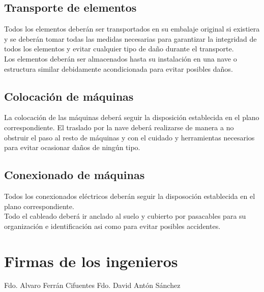 \subsection{Transporte de elementos}
Todos los elementos deberán ser transportados en su embalaje original si existiera y se deberán tomar todas las medidas necesarias para garantizar la integridad de todos los elementos y evitar cualquier tipo de daño durante el transporte. 
\\
Los elementos deberán ser almacenados hasta su instalación en una nave o estructura similar debidamente acondicionada para evitar posibles daños.

\subsection{Colocación de máquinas}
La colocación de las máquinas deberá seguir la disposición establecida en el plano correspondiente. El traslado por la nave deberá realizarse de manera a no obstruir el paso al resto de máquinas y con el cuidado y herramientas necesarios para evitar ocasionar daños de ningún tipo. 



\subsection{Conexionado de máquinas}
Todos los conexionados eléctricos deberán seguir la disposoción establecida en el plano correspondiente.  \\
Todo el cableado deberá ir anclado al suelo y cubierto por pasacables para su organización e identificación asi como para evitar posibles accidentes.


\newpage\section {Firmas de los ingenieros}
\vspace{5cm}
Fdo. Alvaro Ferrán Cifuentes
\vspace{5cm}\hspace{5cm}
Fdo. David Antón Sánchez
